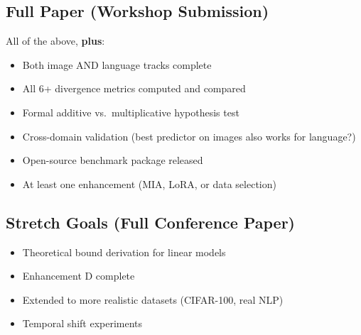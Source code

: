 \documentclass[11pt,a4paper]{article}
\begin{document}
\subsection{Full Paper (Workshop Submission)}

All of the above, \textbf{plus}:
\begin{itemize}[nosep]
    \item[$\square$] Both image AND language tracks complete
    \item[$\square$] All 6+ divergence metrics computed and compared
    \item[$\square$] Formal additive vs.\ multiplicative hypothesis test
    \item[$\square$] Cross-domain validation (best predictor on images also works for language?)
    \item[$\square$] Open-source benchmark package released
    \item[$\square$] At least one enhancement (MIA, LoRA, or data selection)
\end{itemize}

\subsection{Stretch Goals (Full Conference Paper)}

\begin{itemize}[nosep]
    \item[$\square$] Theoretical bound derivation for linear models
    \item[$\square$] Enhancement D complete
    \item[$\square$] Extended to more realistic datasets (CIFAR-100, real NLP)
    \item[$\square$] Temporal shift experiments
\end{itemize}
\end{document}

